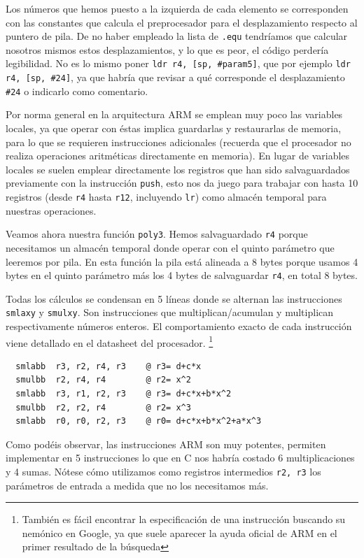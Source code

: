 Los números que hemos puesto a la izquierda de cada elemento se
corresponden con las constantes que calcula el preprocesador para el
desplazamiento respecto al puntero de pila. De no haber empleado la lista
de {\tt .equ} tendríamos que calcular nosotros mismos estos desplazamientos,
y lo que es peor, el código perdería legibilidad. No es lo mismo poner
{\tt ldr r4, [sp, \#param5]}, que por ejemplo {\tt ldr r4, [sp, \#24]}, ya que habría
que revisar a qué corresponde el desplazamiento {\tt \#24} o indicarlo como
comentario.

Por norma general en la arquitectura ARM se emplean muy poco las variables
locales, ya que operar con éstas implica guardarlas y restaurarlas de memoria,
para lo que se requieren instrucciones adicionales (recuerda que el procesador
no realiza operaciones aritméticas directamente en memoria). En lugar de
variables locales se suelen emplear directamente los registros que han sido
salvaguardados previamente con la instrucción {\tt push}, esto nos da juego
para trabajar con hasta 10 registros (desde {\tt r4} hasta {\tt r12},
incluyendo {\tt lr}) como almacén temporal para nuestras operaciones.

Veamos ahora nuestra función {\tt poly3}. Hemos salvaguardado {\tt r4} porque
necesitamos un almacén temporal donde operar con el quinto parámetro que
leeremos por pila. En esta función la pila está alineada a 8 bytes porque
usamos 4 bytes en el quinto parámetro más los 4 bytes de salvaguardar {\tt r4},
en total 8 bytes.

Todas los cálculos se condensan en 5 líneas donde se alternan las instrucciones
{\tt smlaxy} y {\tt smulxy}. Son instrucciones que multiplican/acumulan y
multiplican respectivamente números enteros. El comportamiento exacto de cada
instrucción viene detallado en el datasheet\cite{ATRM} del procesador.
\footnote{
También es fácil encontrar la especificación de una instrucción buscando su
nemónico en Google, ya que suele aparecer la ayuda oficial de ARM en el primer
resultado de la búsqueda}

\begin{lstlisting}
  smlabb  r3, r2, r4, r3    @ r3= d+c*x
  smulbb  r2, r4, r4        @ r2= x^2
  smlabb  r3, r1, r2, r3    @ r3= d+c*x+b*x^2
  smulbb  r2, r2, r4        @ r2= x^3
  smlabb  r0, r0, r2, r3    @ r0= d+c*x+b*x^2+a*x^3
\end{lstlisting}

Como podéis observar, las instrucciones ARM son muy potentes, permiten
implementar en 5 instrucciones lo que en C nos habría costado 6
multiplicaciones y 4 sumas. Nótese cómo utilizamos como registros
intermedios {\tt r2, r3} los parámetros de entrada a medida que no los
necesitamos más.

